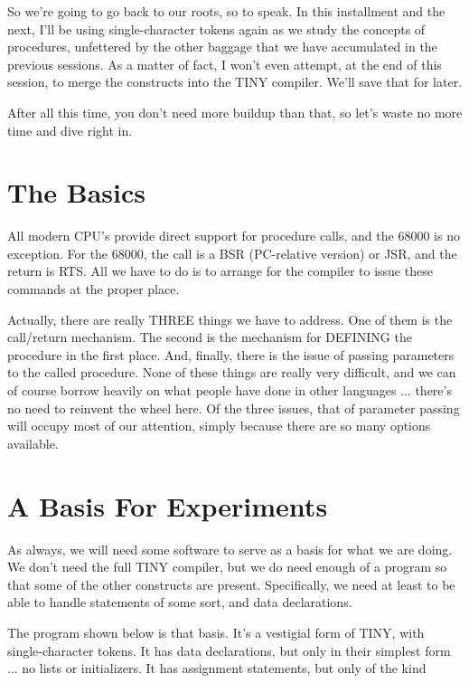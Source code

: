 So we're going to go back to our  roots, so  to  speak. In this installment and the next, I'll be  using  single-character tokens again as we study the concepts of procedures, unfettered  by the other baggage  that we have accumulated in the previous sessions. As a  matter  of  fact, I won't even attempt, at the end of this session, to merge the constructs into the TINY  compiler. We'll save that for later.

After all this time, you don't need more buildup  than  that, so let's waste no more time and dive right in.

\section{The Basics}

All modern  CPU's provide direct support for procedure calls, and the  68000  is no exception. For the 68000, the call  is  a  BSR (PC-relative version) or JSR, and the return is RTS. All we have to do is to arrange for  the  compiler to issue these commands at the proper place.

Actually, there are really THREE things we have to address. One of  them  is  the  call/return  mechanism. The second  is  the mechanism  for  DEFINING  the procedure in the first place. And, finally, there is the issue of passing parameters  to  the called procedure. None of these things are really  very  difficult, and we can of course borrow heavily on what people have done in other languages ... there's no need to reinvent the wheel here. Of the three issues, that of parameter passing will occupy  most  of our attention, simply because there are so many options available.

\section{A Basis For Experiments}

As always, we will need some software to  serve  as  a  basis for what  we are doing. We don't need the full TINY compiler, but we do need enough of a program so that some of the  other constructs are present. Specifically, we need at least to be able to handle statements of some sort, and data declarations.

The program shown below is that basis. It's a vestigial  form of TINY, with single-character tokens. It  has  data declarations, but only in their simplest form ... no lists or initializers. It has assignment statements, but only of the kind

